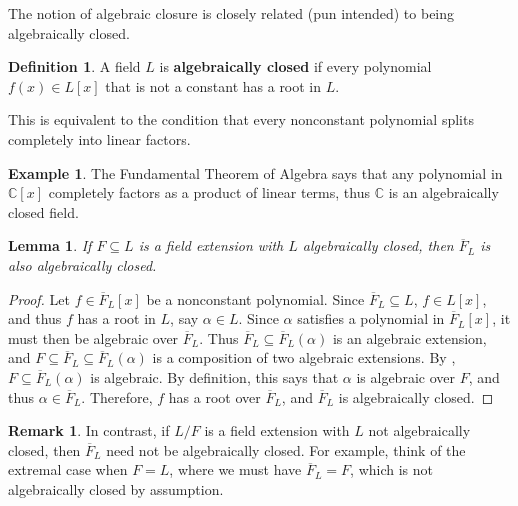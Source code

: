 \documentclass[12pt]{report}
\newtheorem{lemma}[theorem]{Lemma}
\numberwithin{equation}{section}
\numberwithin{theorem}{chapter}
\theoremstyle{definition}
\newtheorem{definition}[theorem]{Definition}
\newtheorem{example}[theorem]{Example}
\newtheorem*{basic properties}{Basic Properties}
\newtheorem*{Important Remark}{Important Remark}
\newtheorem{remark}[theorem]{Remark}
\newcommand{\df}[1]{{\bf #1}\index{#1}}
\newcommand{\C}{\mathbb{C}}
\begin{document}
The notion of algebraic closure is closely related (pun intended) to being algebraically closed.

\begin{definition} 
A field $L$ is \df{algebraically closed} if every polynomial $f(x) \in L[x]$ that is not a constant has a root in $L$. 
\end{definition}

This is equivalent to the condition that every nonconstant polynomial splits completely into linear factors.	
  
  
\begin{example}
The Fundamental Theorem of Algebra says that any polynomial in $\C[x]$ completely factors as a product of linear terms, thus $\C$ is an algebraically closed field.
\end{example}


\begin{lemma}\label{remark alg closure is algclosed}
	If $F \subseteq L$ is a field extension with $L$ algebraically closed, then $\overline{F}_L$ is also algebraically closed.
\end{lemma}

\begin{proof}
Let $f \in \overline{F}_L[x]$ be a nonconstant polynomial. Since $\overline{F}_L \subseteq L$, $f \in L[x]$, and thus $f$ has a root in $L$, say $\alpha \in L$. Since $\alpha$ satisfies a polynomial in $\overline{F}_L[x]$, it must then be algebraic over $\overline{F}_L$. Thus $\overline{F}_L \subseteq \overline{F}_L(\alpha)$ is an algebraic extension, and $F \subseteq \overline{F}_L \subseteq \overline{F}_L(\alpha)$ is a composition of two algebraic extensions. By , $F \subseteq \overline{F}_L(\alpha)$ is algebraic. By definition, this says that $\alpha$ is algebraic over $F$, and thus $\alpha \in \overline{F}_L$. Therefore, $f$ has a root over $\overline{F}_L$, and $\overline{F}_L$ is algebraically closed.
\end{proof}


\begin{remark}\label{remark alg closure inside not alg closed field}
In contrast, if $L/F$ is a field extension with $L$ not algebraically closed, then $\overline{F}_L$ need not be algebraically closed. For example, think of the extremal case when $F=L$, where we must have $\overline{F}_L=F$, which is not algebraically closed by assumption.
\end{remark}
\end{document}
